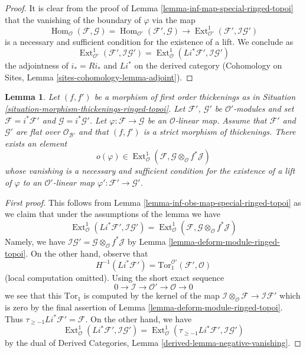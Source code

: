\documentclass{stacks-project}
\theoremstyle{plain}
\newtheorem{lemma}[subsection]{Lemma}
\theoremstyle{definition}
\theoremstyle{remark}
\numberwithin{equation}{subsection}
\def\Hom{\mathop{\mathrm{Hom}}\nolimits}
\def\Ext{\mathop{\mathrm{Ext}}\nolimits}
\begin{document}
\begin{proof}
It is clear from the proof of Lemma \ref{lemma-inf-map-special-ringed-topoi}
that the vanishing of the boundary of $\varphi$ via the map
$$
\Hom_\mathcal{O}(\mathcal{F}, \mathcal{G}) =
\Hom_{\mathcal{O}'}(\mathcal{F}', \mathcal{G}) \longrightarrow
\Ext^1_{\mathcal{O}'}(\mathcal{F}', \mathcal{I}\mathcal{G}')
$$
is a necessary and sufficient condition for the existence of a lift. We
conclude as
$$
\Ext^1_{\mathcal{O}'}(\mathcal{F}', \mathcal{I}\mathcal{G}') =
\Ext^1_\mathcal{O}(Li^*\mathcal{F}', \mathcal{I}\mathcal{G}')
$$
the adjointness of $i_* = Ri_*$ and $Li^*$ on the derived category
(Cohomology on Sites, Lemma \ref{sites-cohomology-lemma-adjoint}).
\end{proof}

\begin{lemma}
\label{lemma-inf-obs-map-rel-ringed-topoi}
Let $(f, f')$ be a morphism of first order thickenings as in
Situation \ref{situation-morphism-thickenings-ringed-topoi}.
Let $\mathcal{F}'$, $\mathcal{G}'$ be $\mathcal{O}'$-modules and set
$\mathcal{F} = i^*\mathcal{F}'$ and $\mathcal{G} = i^*\mathcal{G}'$.
Let $\varphi : \mathcal{F} \to \mathcal{G}$ be an $\mathcal{O}$-linear map.
Assume that $\mathcal{F}'$ and $\mathcal{G}'$ are flat over
$\mathcal{O}_{\mathcal{B}'}$ and
that $(f, f')$ is a strict morphism of thickenings. There exists an element
$$
o(\varphi) \in
\Ext^1_\mathcal{O}(\mathcal{F},
\mathcal{G} \otimes_\mathcal{O} f^*\mathcal{J})
$$
whose vanishing is a necessary and sufficient condition for the
existence of a lift of $\varphi$ to an $\mathcal{O}'$-linear map
$\varphi' : \mathcal{F}' \to \mathcal{G}'$.
\end{lemma}

\begin{proof}[First proof]
This follows from Lemma \ref{lemma-inf-obs-map-special-ringed-topoi}
as we claim that under the assumptions of the lemma we have
$$
\Ext^1_\mathcal{O}(Li^*\mathcal{F}', \mathcal{I}\mathcal{G}') =
\Ext^1_\mathcal{O}(\mathcal{F},
\mathcal{G} \otimes_\mathcal{O} f^*\mathcal{J})
$$
Namely, we have
$\mathcal{I}\mathcal{G}' =
\mathcal{G} \otimes_\mathcal{O} f^*\mathcal{J}$
by Lemma \ref{lemma-deform-module-ringed-topoi}.
On the other hand, observe that
$$
H^{-1}(Li^*\mathcal{F}') =
\text{Tor}_1^{\mathcal{O}'}(\mathcal{F}', \mathcal{O})
$$
(local computation omitted). Using the short exact sequence
$$
0 \to \mathcal{I} \to \mathcal{O}' \to \mathcal{O} \to 0
$$
we see that this $\text{Tor}_1$ is computed by the kernel of the map
$\mathcal{I} \otimes_\mathcal{O} \mathcal{F} \to \mathcal{I}\mathcal{F}'$
which is zero by the final assertion of
Lemma \ref{lemma-deform-module-ringed-topoi}.
Thus $\tau_{\geq -1}Li^*\mathcal{F}' = \mathcal{F}$.
On the other hand, we have
$$
\Ext^1_\mathcal{O}(Li^*\mathcal{F}',
\mathcal{I}\mathcal{G}') =
\Ext^1_\mathcal{O}(\tau_{\geq -1}Li^*\mathcal{F}',
\mathcal{I}\mathcal{G}')
$$
by the dual of
Derived Categories, Lemma \ref{derived-lemma-negative-vanishing}.
\end{proof}
\end{document}
